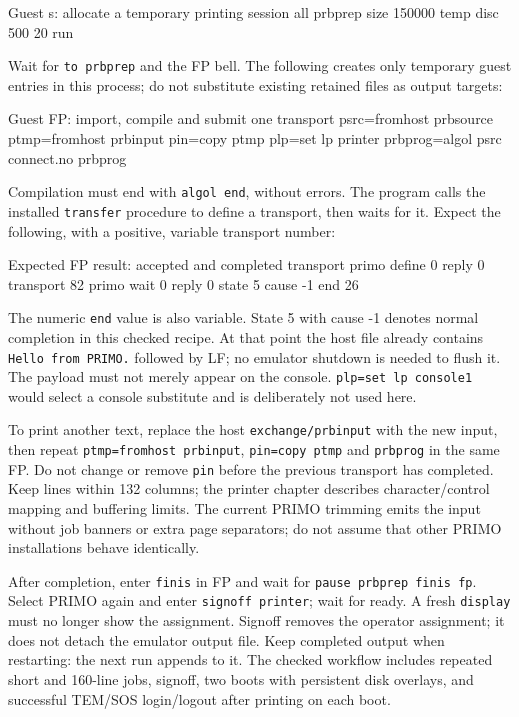 \begin{commandexample}{Guest s: allocate a temporary printing session}
all prbprep size 150000 temp disc 500 20 run
\end{commandexample}

Wait for \texttt{to prbprep} and the FP bell. The following creates only
temporary guest entries in this process; do not substitute existing retained
files as output targets:

\begin{commandexample}{Guest FP: import, compile and submit one transport}
psrc=fromhost prbsource
ptmp=fromhost prbinput
pin=copy ptmp
plp=set lp printer
prbprog=algol psrc connect.no
prbprog
\end{commandexample}

Compilation must end with \texttt{algol end}, without errors. The program
calls the installed \texttt{transfer} procedure to define a transport, then
waits for it. Expect the following, with a positive, variable transport number:

\begin{commandexample}{Expected FP result: accepted and completed transport}
primo define 0 reply 0 transport 82
primo wait 0 reply 0 state 5 cause -1
end         26
\end{commandexample}

The numeric \texttt{end} value is also variable. State 5 with cause -1
denotes normal completion in this checked recipe. At that point the host
file already contains \texttt{Hello from PRIMO.} followed by LF; no emulator
shutdown is needed to flush it. The payload must not merely appear on the
console. \texttt{plp=set lp console1} would select a console substitute and
is deliberately not used here.

To print another text, replace the host \texttt{exchange/prbinput} with the
new input, then repeat \texttt{ptmp=fromhost prbinput}, \texttt{pin=copy ptmp}
and \texttt{prbprog} in the same FP. Do not change or remove \texttt{pin}
before the previous transport has completed. Keep lines within 132 columns;
the printer chapter describes character/control mapping and buffering limits.
The current PRIMO trimming emits the input without job banners or extra page
separators; do not assume that other PRIMO installations behave identically.

After completion, enter \texttt{finis} in FP and wait for
\texttt{pause prbprep finis fp}. Select PRIMO again and enter
\texttt{signoff printer}; wait for ready. A fresh \texttt{display} must no
longer show the assignment. Signoff removes the operator assignment; it does
not detach the emulator output file. Keep completed output when restarting:
the next run appends to it. The checked workflow includes repeated short and
160-line jobs, signoff, two boots with persistent disk overlays, and successful
TEM/SOS login/logout after printing on each boot.

